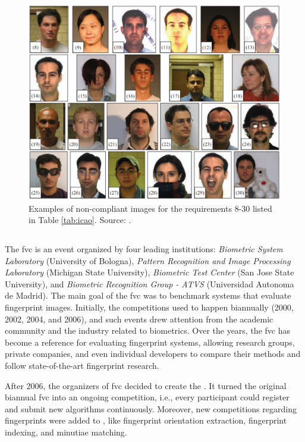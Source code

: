 

\begin{figure}[h]
\centering
\includegraphics[width=\linewidth]{images/dataset/icao.png}
\caption{Examples of non-compliant images for the requirements 8-30 listed in Table \ref{tab:icao}. Source: \cite{maltoni2009biolab}.}
\label{fig:icao}
\end{figure}

\subsection{\fvcongoing} \label{sec:fvcongoing}

The \acf{fvc} is an event organized by four leading institutions: \textit{Biometric System Laboratory} (University of Bologna), \textit{Pattern Recognition and Image Processing Laboratory} (Michigan State University), \textit{Biometric Test Center} (San Jose State University), and \textit{Biometric Recognition Group - ATVS} (Universidad Autonoma de Madrid). The main goal of the \acs{fvc} was to benchmark systems that evaluate fingerprint images. Initially, the competitions used to happen biannually (2000, 2002, 2004, and 2006), and such events drew attention from the academic community and the industry related to biometrics. Over the years, the \acs{fvc} has become a reference for evaluating fingerprint systems, allowing research groups, private companies, and even individual developers to compare their methods and follow state-of-the-art fingerprint research.

After 2006, the organizers of \acs{fvc} decided to create the \fvcongoing. It turned the original biannual \acs{fvc} into an ongoing competition, i.e., every participant could register and submit new algorithms continuously. Moreover, new competitions regarding fingerprints were added to \fvcongoing, like fingerprint orientation extraction, fingerprint indexing, and minutiae matching.

